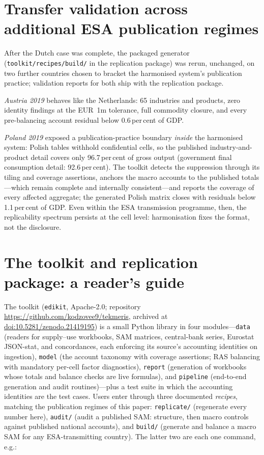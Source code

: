 \section{Transfer validation across additional ESA publication regimes}
\label{app:transfer}

After the Dutch case was complete, the packaged generator
(\texttt{toolkit/recipes/build/} in the replication package) was rerun,
unchanged, on two further countries chosen to bracket the harmonised
system's publication practice; validation reports for both ship with the
replication package.

\emph{Austria 2019} behaves like the Netherlands: 65 industries and
products, zero identity findings at the EUR~1m tolerance, full commodity
closure, and every pre-balancing account residual below 0.6\,per\,cent
of GDP.

\emph{Poland 2019} exposed a publication-practice boundary \emph{inside}
the harmonised system: Polish tables withhold confidential cells, so the
published industry-and-product detail covers only 96.7\,per\,cent of
gross output (government final consumption detail: 92.6\,per\,cent). The
toolkit detects the suppression through its tiling and coverage
assertions, anchors the macro accounts to the published totals---which
remain complete and internally consistent---and reports the coverage of
every affected aggregate; the generated Polish matrix closes with
residuals below 1.1\,per\,cent of GDP. Even within the ESA transmission
programme, then, the replicability spectrum persists at the cell level:
harmonisation fixes the format, not the disclosure.

\section{The toolkit and replication package: a reader's guide}
\label{app:toolkit}

The toolkit (\texttt{edikit}, Apache-2.0; repository
\url{https://github.com/kodzovee9/tekmeris}, archived at
\href{https://doi.org/10.5281/zenodo.21419195}{doi:10.5281/zenodo.21419195})
is a small Python library in four modules---\texttt{data} (readers for supply--use workbooks, SAM
matrices, central-bank series, Eurostat JSON-stat, and concordances, each
enforcing its source's accounting identities on ingestion),
\texttt{model} (the account taxonomy with coverage assertions; RAS
balancing with mandatory per-cell factor diagnostics), \texttt{report}
(generation of workbooks whose totals and balance checks are live
formulas), and \texttt{pipeline} (end-to-end generation and audit
routines)---plus a test suite in which the accounting identities are the
test cases. Users enter through three documented \emph{recipes},
matching the publication regimes of this paper: \texttt{replicate/}
(regenerate every number here), \texttt{audit/} (audit a published SAM:
structure, then macro controls against published national accounts), and
\texttt{build/} (generate and balance a macro SAM for any
ESA-transmitting country). The latter two are each one command, e.g.:

